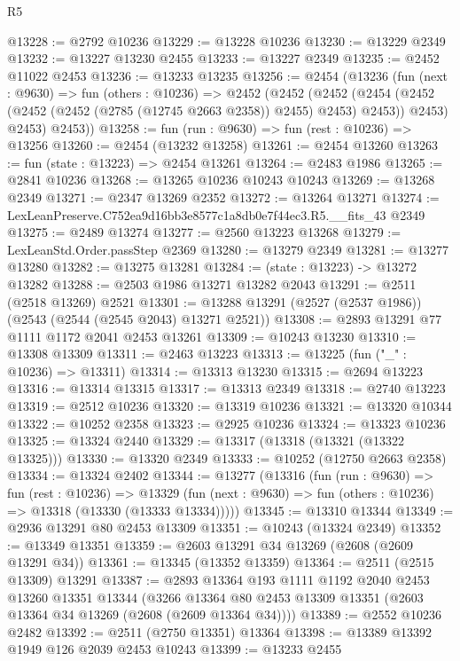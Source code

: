 \begin{lexlean}{R5}
\begin{coremodule}
@13228 := @2792 @10236
@13229 := @13228 @10236
@13230 := @13229 @2349
@13232 := @13227 @13230 @2455
@13233 := @13227 @2349
@13235 := @2452 @11022 @2453
@13236 := @13233 @13235
@13256 := @2454
    (@13236
      (fun (next : @9630) =>
      fun (others : @10236) =>
      @2452
        (@2452
          (@2452
            (@2454 (@2452 (@2452 (@2452 (@2785 (@12745 @2663 @2358)) @2455) @2453) @2453))
            @2453)
          @2453)
        @2453))
@13258 := fun (run : @9630) => fun (rest : @10236) => @13256
@13260 := @2454 (@13232 @13258)
@13261 := @2454 @13260
@13263 := fun (state : @13223) => @2454 @13261
@13264 := @2483 @1986
@13265 := @2841 @10236
@13268 := @13265 @10236 @10243 @10243
@13269 := @13268 @2349
@13271 := @2347 @13269 @2352
@13272 := @13264 @13271
@13274 := LexLeanPreserve.C752ea9d16bb3e8577c1a8db0e7f44ec3.R5.__fits_43 @2349
@13275 := @2489 @13274
@13277 := @2560 @13223 @13268
@13279 := LexLeanStd.Order.passStep @2369
@13280 := @13279 @2349
@13281 := @13277 @13280
@13282 := @13275 @13281
@13284 := (state : @13223) -> @13272 @13282
@13288 := @2503 @1986 @13271 @13282 @2043
@13291 := @2511 (@2518 @13269) @2521
@13301 := @13288 @13291 (@2527 (@2537 @1986)) (@2543 (@2544 (@2545 @2043) @13271 @2521))
@13308 := @2893 @13291 @77 @1111 @1172 @2041 @2453 @13261
@13309 := @10243 @13230
@13310 := @13308 @13309
@13311 := @2463 @13223
@13313 := @13225 (fun ("_" : @10236) => @13311)
@13314 := @13313 @13230
@13315 := @2694 @13223
@13316 := @13314 @13315
@13317 := @13313 @2349
@13318 := @2740 @13223
@13319 := @2512 @10236
@13320 := @13319 @10236
@13321 := @13320 @10344
@13322 := @10252 @2358
@13323 := @2925 @10236
@13324 := @13323 @10236
@13325 := @13324 @2440
@13329 := @13317 (@13318 (@13321 (@13322 @13325)))
@13330 := @13320 @2349
@13333 := @10252 (@12750 @2663 @2358)
@13334 := @13324 @2402
@13344 := @13277
    (@13316
      (fun (run : @9630) =>
      fun (rest : @10236) =>
      @13329 (fun (next : @9630) => fun (others : @10236) => @13318 (@13330 (@13333 @13334)))))
@13345 := @13310 @13344
@13349 := @2936 @13291 @80 @2453 @13309
@13351 := @10243 (@13324 @2349)
@13352 := @13349 @13351
@13359 := @2603 @13291 @34 @13269 (@2608 (@2609 @13291 @34))
@13361 := @13345 (@13352 @13359)
@13364 := @2511 (@2515 @13309) @13291
@13387 := @2893
    @13364
    @193
    @1111
    @1192
    @2040
    @2453
    @13260
    @13351
    @13344
    (@3266 @13364 @80 @2453 @13309 @13351 (@2603 @13364 @34 @13269 (@2608 (@2609 @13364 @34))))
@13389 := @2552 @10236 @2482
@13392 := @2511 (@2750 @13351) @13364
@13398 := @13389 @13392 @1949 @126 @2039 @2453 @10243
@13399 := @13233 @2455

\end{coremodule}
\end{lexlean}
